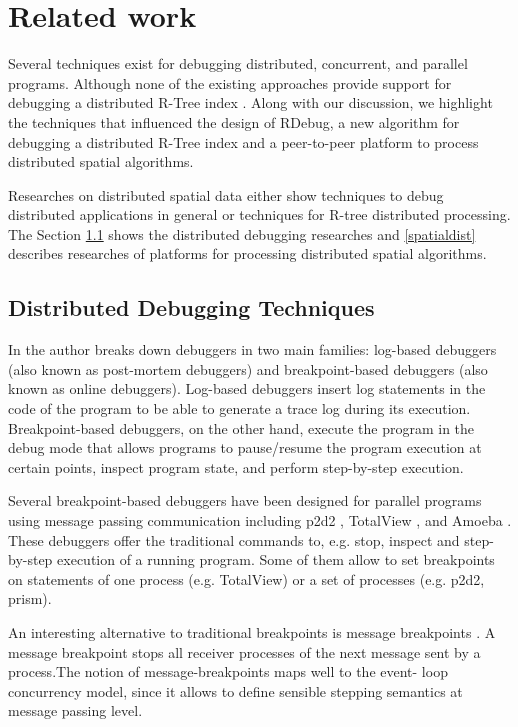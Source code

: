 \section{Related work}
\label{sec:related}

Several techniques exist for debugging distributed, concurrent, and parallel programs. Although none of the existing approaches provide support for debugging a distributed R-Tree index \cite{manolopoulos2003rth,jacox2007spatial}. Along with our discussion, we highlight the techniques that influenced the design of RDebug, a new algorithm for debugging a distributed R-Tree index and a peer-to-peer platform to process distributed spatial algorithms.

Researches on distributed spatial data either show techniques to debug distributed applications in general or techniques for R-tree distributed processing. The Section \ref{dist_debug} shows the distributed debugging researches and \ref{spatialdist} describes researches of platforms for processing distributed spatial algorithms.
	
\subsection{Distributed Debugging Techniques}
\label{dist_debug}

In \cite{remeD2011} the author breaks down debuggers in two main families: log-based debuggers (also known as post-mortem debuggers) and breakpoint-based debuggers (also known as online debuggers). Log-based debuggers insert log statements in the code of the program to be able to generate a trace log during its execution. Breakpoint-based debuggers, on the other hand, execute the program in the debug mode that allows programs to pause/resume the program execution at certain points, inspect program state, and perform step-by-step execution. 

Several breakpoint-based debuggers have been designed for parallel programs using message passing communication including p2d2 \cite{p2d21996}, TotalView \cite{totalView2009}, and Amoeba \cite{amoeba1989}. These debuggers offer the traditional commands to, e.g. stop, inspect and step-by-step execution of a running program. Some of them allow to set breakpoints on statements of one process (e.g. TotalView) or a set of processes (e.g. p2d2, prism). 

An interesting alternative to traditional breakpoints is message breakpoints \cite{debuggingMP1997}. A message breakpoint stops all receiver processes of the next message sent by a process.The notion of message-breakpoints maps well to the event- loop concurrency model, since it allows to define sensible stepping semantics at message passing level.

